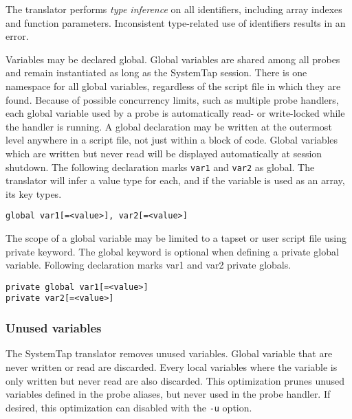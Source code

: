 \documentclass[twoside,english]{article}
\newenvironment{vindent}
{\begin{list}{}{\setlength{\listparindent}{6pt}}
\item[]}
{\end{list}}
\begin{document}
The translator performs \emph{type inference} on all identifiers, including
array indexes and function parameters. Inconsistent type-related use of identifiers
results in an error.

Variables may be declared global. Global variables are shared among all probes
and remain instantiated as long as the SystemTap session. There is one namespace
for all global variables, regardless of the script file in which they are
found. Because of possible concurrency limits, such as multiple probe handlers,
each global variable used by a probe is automatically read- or write-locked
while the handler is running. A global declaration may be written at the
outermost level anywhere in a script file, not just within a block of code.
Global variables which are written but never read will be displayed
automatically at session shutdown.  The following declaration marks
\texttt{var1} and \texttt{var2} as global.
The translator will infer a value type for each, and if the variable is used
as an array, its key types.

\begin{vindent}
\begin{verbatim}
global var1[=<value>], var2[=<value>]
\end{verbatim}
\end{vindent}

The scope of a global variable may be limited to a tapset or
user script file using private keyword. The global keyword is optional when
defining a private global variable. Following declaration marks var1 and var2
private globals.

\begin{vindent}
\begin{verbatim}
private global var1[=<value>]
private var2[=<value>]
\end{verbatim}
\end{vindent}

\subsubsection{Unused variables}

The SystemTap translator removes unused variables. Global variable
that are never written or read are discarded.  Every local variables
where the variable is only written but never read are also
discarded. This optimization prunes unused variables defined
in the probe aliases, but never used in the probe handler.
If desired, this optimization can disabled with the \texttt{-u} option.
\end{document}
